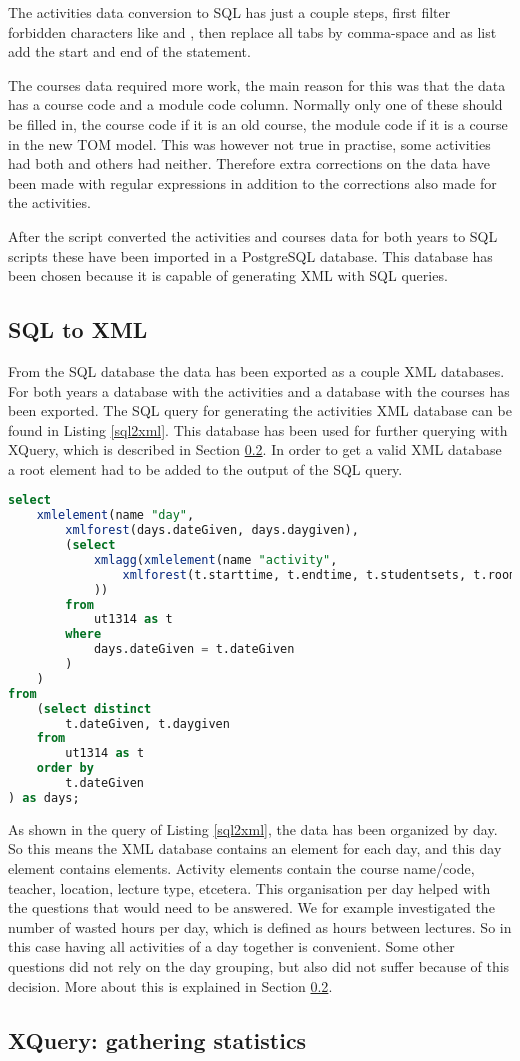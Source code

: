 The activities data conversion to SQL has just a couple steps, first filter forbidden characters like  and , then replace all tabs by comma-space and as list add the start and end of the  statement.

The courses data required more work, the main reason for this was that the data has a course code and a module code column. Normally only one of these should be filled in, the course code if it is an old course, the module code if it is a course in the new TOM model. This was however not true in practise, some activities had both and others had neither. Therefore extra corrections on the data have been made with regular expressions in addition to the corrections also made for the activities.

After the script converted the activities and courses data for both years to SQL scripts these have been imported in a PostgreSQL database. This database has been chosen because it is capable of generating XML with SQL queries.

\subsection{SQL to XML}
From the SQL database the data has been exported as a couple XML databases. For both years a database with the activities and a database with the courses has been exported. The SQL query for generating the activities XML database can be found in Listing \ref{sql2xml}. This database has been used for further querying with XQuery, which is described in Section \ref{xquery}. In order to get a valid XML database a root element had to be added to the output of the SQL query.

\begin{lstlisting}[caption=SQL to XML conversion, label=sql2xml, float=htpb, language=sql]
select
	xmlelement(name "day",
		xmlforest(days.dateGiven, days.daygiven),
		(select
			xmlagg(xmlelement(name "activity",
				xmlforest(t.starttime, t.endtime, t.studentsets, t.room, t.coursename, t.teacher)
			))
		from
			ut1314 as t
		where
			days.dateGiven = t.dateGiven
		)
	)
from
	(select distinct
		t.dateGiven, t.daygiven
	from
		ut1314 as t
	order by
		t.dateGiven
) as days;
\end{lstlisting}

As shown in the query of Listing \ref{sql2xml}, the data has been organized by day. So this means the XML database contains an element for each day, and this day element contains  elements. Activity elements contain the course name/code, teacher, location, lecture type, etcetera. This organisation per day helped with the questions that would need to be answered. We for example investigated the number of wasted hours per day, which is defined as hours between lectures. So in this case having all activities of a day together is convenient. Some other questions did not rely on the day grouping, but also did not suffer because of this decision. More about this is explained in Section \ref{xquery}. 

\subsection{XQuery: gathering statistics} \label{xquery}
